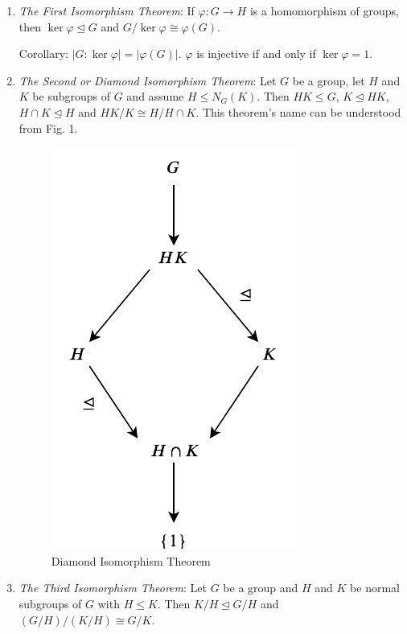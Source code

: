 \documentclass{article}
\numberwithin{equation}{section}
\theoremstyle{definition}
\numberwithin{definition}{section}
\numberwithin{theorem}{section}
\theoremstyle{remark}
\numberwithin{exercise}{section}
\begin{document}
    \begin{enumerate}
    
    \item\textit{The First Isomorphism Theorem}: If $\varphi: G\to H$ is a homomorphism of groups, then $\ker \varphi \unlhd G$ and $G/\ker \varphi \cong \varphi(G).$
    
    Corollary: $|G:\ker\varphi|=|\varphi(G)|$. $\varphi$ is injective if and only if $\ker \varphi = 1$.
    
    \item\textit{The Second or Diamond Isomorphism Theorem}: Let $G$ be a group, let $H$ and $K$ be subgroups of $G$ and assume $H\leq N_{G}(K)$. Then $HK\leq G$, $K\unlhd HK$, $H\cap K\unlhd H$ and $HK/K\cong H/H\cap K$. This theorem's name can be understood from Fig. 1.
    
    \begin{figure}[ht!]
        \centering
        \includegraphics{img/diamondIsoThm.pdf}
        \caption{Diamond Isomorphism Theorem}
        \label{Fig. 1}
    \end{figure}
    
    \item\textit{The Third Isomorphism Theorem}: Let $G$ be a group and $H$ and $K$ be normal subgroups of $G$ with $H\leq K$. Then $K/H\unlhd G/H$ and $(G/H)/(K/H)\cong G/K$.
    

\end{enumerate}
\end{document}
